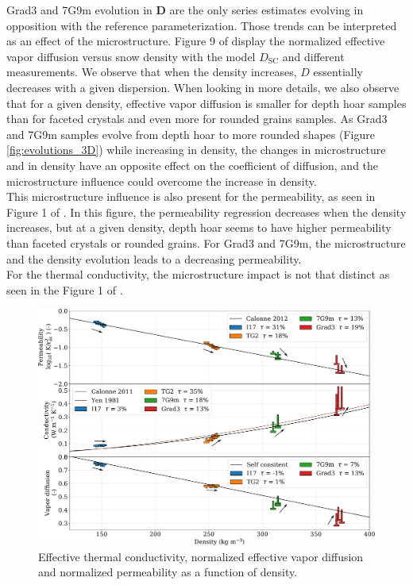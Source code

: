 \documentclass[draft,ms]{agujournal2019}
\begin{document}
Grad3 and 7G9m evolution in \textbf{D} are the only series estimates evolving in opposition with the reference parameterization. Those trends can be interpreted as an effect of the microstructure. Figure 9 of  display the normalized effective vapor diffusion versus snow density with the model $D_{\mathrm{SC}}$ and different measurements. We observe that when the density increases, $D$ essentially decreases with a given dispersion. When looking in more details, we also observe that for a given density, effective vapor diffusion is smaller for depth hoar samples than for faceted crystals and even more for rounded grains samples. As Grad3 and 7G9m samples evolve from depth hoar to more rounded shapes (Figure \ref{fig:evolutions_3D}) while increasing in density, the changes in microstructure and in density have an opposite effect on the coefficient of diffusion, and the microstructure influence could overcome the increase in density. \\
This microstructure influence is also present for the permeability, as seen in Figure 1 of . In this figure, the permeability regression decreases when the density increases, but at a given density, depth hoar seems to have higher permeability than faceted crystals or rounded grains. For Grad3 and 7G9m, the microstructure and the density evolution leads to a decreasing permeability.\\
For the thermal conductivity, the microstructure impact is not that distinct as seen in the Figure 1 of .


\begin{figure}
    \centering
    \includegraphics[width=\linewidth]{Figures/tplot_all_arrows.pdf}
    \caption{Effective thermal conductivity, normalized effective vapor diffusion and normalized permeability as a function of density.}
    \label{fig:Tplot}
\end{figure}
\end{document}

